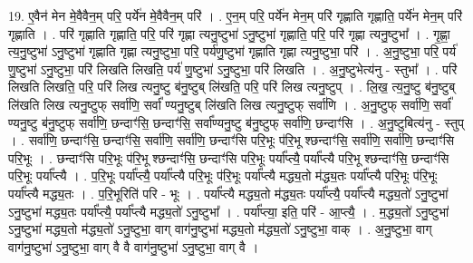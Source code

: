 \documentclass[17pt]{extarticle}
\begin{document}
19. ए॒वैन॑ मेन मे॒वैवैन॒म् परि॒ पर्ये॑न मे॒वैवैन॒म् परि॑ । . ए॒न॒म् परि॒ पर्ये॑न मेन॒म् परि॑ गृह्णाति गृह्णाति॒ पर्ये॑न मेन॒म् परि॑ गृह्णाति । . परि॑ गृह्णाति गृह्णाति॒ परि॒ परि॑ गृह्णा त्यनु॒ष्टुभा॑ ऽनु॒ष्टुभा॑ गृह्णाति॒ परि॒ परि॑ गृह्णा त्यनु॒ष्टुभा᳚ । . गृ॒ह्णा॒ त्य॒नु॒ष्टुभा॑ ऽनु॒ष्टुभा॑ गृह्णाति गृह्णा त्यनु॒ष्टुभा॒ परि॒ पर्य॑णु॒ष्टुभा॑ गृह्णाति गृह्णा त्यनु॒ष्टुभा॒ परि॑ । . अ॒नु॒ष्टुभा॒ परि॒ पर्य॑ णु॒ष्टुभा॑ ऽनु॒ष्टुभा॒ परि॑ लिखति लिखति॒ पर्य॑ णु॒ष्टुभा॑ ऽनु॒ष्टुभा॒ परि॑ लिखति । . अ॒नु॒ष्टुभेत्य॑नु - स्तुभा᳚ । . परि॑ लिखति लिखति॒ परि॒ परि॑ लिख त्यनु॒ष्टु ब॑नु॒ष्टुब् लि॑खति॒ परि॒ परि॑ लिख त्यनु॒ष्टुप् । . लि॒ख॒ त्य॒नु॒ष्टु ब॑नु॒ष्टुब् लि॑खति लिख त्यनु॒ष्टुफ् सर्वा॑णि॒ सर्वा᳚ ण्यनु॒ष्टुब् लि॑खति लिख त्यनु॒ष्टुफ् सर्वा॑णि । . अ॒नु॒ष्टुफ् सर्वा॑णि॒ सर्वा᳚ ण्यनु॒ष्टु ब॑नु॒ष्टुफ् सर्वा॑णि॒ छन्दाꣳ॑सि॒ छन्दाꣳ॑सि॒ सर्वा᳚ण्यनु॒ष्टु ब॑नु॒ष्टुफ् सर्वा॑णि॒ छन्दाꣳ॑सि । . अ॒नु॒ष्टुबित्य॑नु - स्तुप् । . सर्वा॑णि॒ छन्दाꣳ॑सि॒ छन्दाꣳ॑सि॒ सर्वा॑णि॒ सर्वा॑णि॒ छन्दाꣳ॑सि परि॒भूः प॑रि॒भू श्छन्दाꣳ॑सि॒ सर्वा॑णि॒ सर्वा॑णि॒ छन्दाꣳ॑सि परि॒भूः । . छन्दाꣳ॑सि परि॒भूः प॑रि॒भू श्छन्दाꣳ॑सि॒ छन्दाꣳ॑सि परि॒भूः पर्या᳚प्त्यै॒ पर्या᳚प्त्यै परि॒भू श्छन्दाꣳ॑सि॒ छन्दाꣳ॑सि परि॒भूः पर्या᳚प्त्यै । . प॒रि॒भूः पर्या᳚प्त्यै॒ पर्या᳚प्त्यै परि॒भूः प॑रि॒भूः पर्या᳚प्त्यै मद्ध्य॒तो म॑द्ध्य॒तः पर्या᳚प्त्यै परि॒भूः प॑रि॒भूः पर्या᳚प्त्यै मद्ध्य॒तः । . प॒रि॒भूरिति॑ परि - भूः । . पर्या᳚प्त्यै मद्ध्य॒तो म॑द्ध्य॒तः पर्या᳚प्त्यै॒ पर्या᳚प्त्यै मद्ध्य॒तो॑ ऽनु॒ष्टुभा॑ ऽनु॒ष्टुभा॑ मद्ध्य॒तः पर्या᳚प्त्यै॒ पर्या᳚प्त्यै मद्ध्य॒तो॑ ऽनु॒ष्टुभा᳚ । . पर्या᳚प्त्या॒ इति॒ परि॑ - आ॒प्त्यै॒ । . म॒द्ध्य॒तो॑ ऽनु॒ष्टुभा॑ ऽनु॒ष्टुभा॑ मद्ध्य॒तो म॑द्ध्य॒तो॑ ऽनु॒ष्टुभा॒ वाग् वाग॑नु॒ष्टुभा॑ मद्ध्य॒तो म॑द्ध्य॒तो॑ ऽनु॒ष्टुभा॒ वाक् । . अ॒नु॒ष्टुभा॒ वाग् वाग॑नु॒ष्टुभा॑ ऽनु॒ष्टुभा॒ वाग् वै वै वाग॑नु॒ष्टुभा॑ ऽनु॒ष्टुभा॒ वाग् वै । \newline
\end{document}
